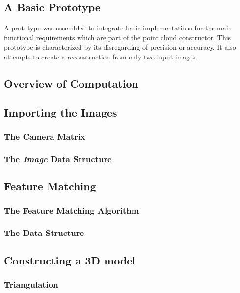 \documentclass[12pt,a4paper,twoside,openright]{report}
\begin{document}
\subsection{A Basic Prototype}
A prototype was assembled to integrate basic implementations for the main functional requirements which are part of the point cloud constructor. This prototype is characterized by its disregarding of precision or accuracy. It also attempts to create a reconstruction from only two input images. 

\subsection{Overview of Computation}


\subsection{Importing the Images}

\subsubsection{The Camera Matrix}

\subsubsection{The \emph{Image} Data Structure}

\subsection{Feature Matching}

\subsubsection{The Feature Matching Algorithm}

\subsubsection{The Data Structure}

\subsection{Constructing a 3D model}
\subsubsection{Triangulation}
\end{document}
